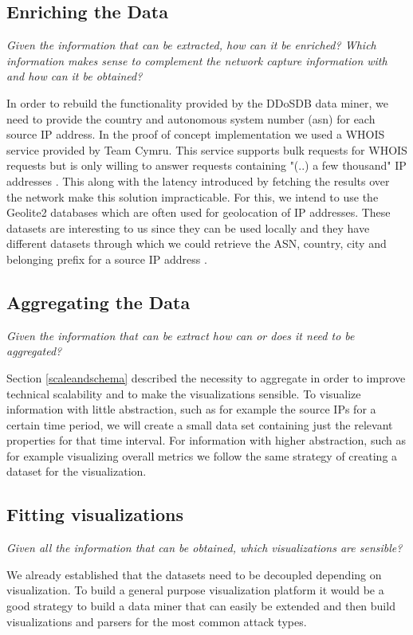     \subsection{Enriching the Data}
\label{enrichingthedata}    \textit{Given the information that can be extracted, how can it be enriched? Which information makes sense to complement the network capture information with and how can it be obtained?}
    
In order to rebuild the functionality provided by the DDoSDB data miner, we need to provide the country and autonomous system number (asn) for each source IP address.
In the proof of concept implementation we used a WHOIS service provided by Team Cymru. This service supports bulk requests for WHOIS requests but is only willing to answer requests containing "(..) a few thousand" IP addresses \cite{teamcymru}. This along with the latency introduced by fetching the results over the network make this solution impracticable. For this, we intend to use the Geolite2 databases which are often used for geolocation of IP addresses. These datasets are interesting to us since they can be used locally and they have different datasets through which we could retrieve the ASN, country, city and belonging prefix for a source IP address \cite{geolite2}.

    
    \subsection{Aggregating the Data} 
\textit{Given the information that can be extract how can or does it need to be aggregated?
}    

Section \ref{scaleandschema} described the necessity to aggregate in order to improve technical scalability and to make the visualizations sensible.
To visualize information with little abstraction, such as for example the source IPs for a certain time period, we will create a small data set containing just the relevant properties for that time interval.
For information with higher abstraction, such as for example visualizing overall metrics we follow the same strategy of creating a dataset for the visualization.
    \subsection{Fitting visualizations}
\textit{Given all the information that can be obtained, which visualizations are sensible?
}

We already established that the datasets need to be decoupled depending on visualization. To build a general purpose visualization platform it would be a good strategy to build a data miner that can easily be extended and then build visualizations and parsers for the most common attack types.
